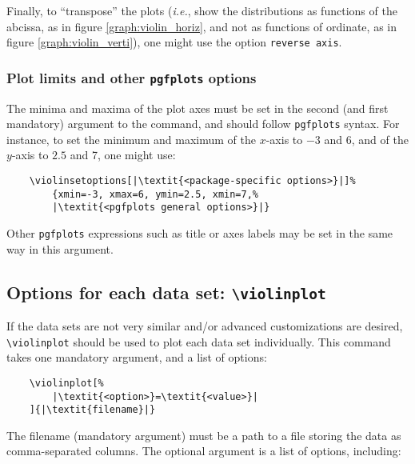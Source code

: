 \documentclass{article}
\begin{document}
Finally, to ``transpose'' the plots (\textit{i.e.}, show the distributions
as functions of the abcissa, as in figure \ref{graph:violin_horiz},
and not as functions of ordinate, as in figure \ref{graph:violin_verti}),
one might use the option \texttt{reverse axis}.

\subsubsection{Plot limits and other \texttt{pgfplots} options}

The minima and maxima of the plot axes must be set in the second (and first
mandatory) argument to the command, and should follow \texttt{pgfplots}
syntax. For instance, to set the minimum and maximum of the $x$-axis
to $-3$ and 6, and of the $y$-axis to $2.5$ and 7, one might use:

\begin{verbatim}
	\violinsetoptions[|\textit{<package-specific options>}|]%
		{xmin=-3, xmax=6, ymin=2.5, xmin=7,%
		|\textit{<pgfplots general options>}|}
\end{verbatim}

Other \texttt{pgfplots} expressions such as title or axes labels may be set
in the same way in this argument.

\subsection{Options for each data set: \texttt{{\textbackslash}violinplot}}

If the data sets are not very similar and/or advanced customizations
are desired, \texttt{{\textbackslash}violinplot} should be used to
plot each data set individually.
This command takes one mandatory argument, and a list of options:

\begin{verbatim}
	\violinplot[%
		|\textit{<option>}=\textit{<value>}|
	]{|\textit{filename}|}
\end{verbatim}

The filename (mandatory argument) must be a path to a file storing the data as
comma-separated columns. The optional argument is a list of options, including:
\end{document}

